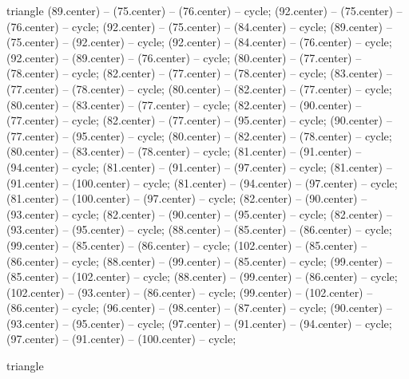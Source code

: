\begin{pgfonlayer}{triangle}
 (89.center) -- (75.center) -- (76.center) -- cycle; 
 (92.center) -- (75.center) -- (76.center) -- cycle; 
 (92.center) -- (75.center) -- (84.center) -- cycle; 
 (89.center) -- (75.center) -- (92.center) -- cycle; 
 (92.center) -- (84.center) -- (76.center) -- cycle; 
 (92.center) -- (89.center) -- (76.center) -- cycle; 
 (80.center) -- (77.center) -- (78.center) -- cycle; 
 (82.center) -- (77.center) -- (78.center) -- cycle; 
 (83.center) -- (77.center) -- (78.center) -- cycle; 
 (80.center) -- (82.center) -- (77.center) -- cycle; 
 (80.center) -- (83.center) -- (77.center) -- cycle; 
 (82.center) -- (90.center) -- (77.center) -- cycle; 
 (82.center) -- (77.center) -- (95.center) -- cycle; 
 (90.center) -- (77.center) -- (95.center) -- cycle; 
 (80.center) -- (82.center) -- (78.center) -- cycle; 
 (80.center) -- (83.center) -- (78.center) -- cycle; 
 (81.center) -- (91.center) -- (94.center) -- cycle; 
 (81.center) -- (91.center) -- (97.center) -- cycle; 
 (81.center) -- (91.center) -- (100.center) -- cycle; 
 (81.center) -- (94.center) -- (97.center) -- cycle; 
 (81.center) -- (100.center) -- (97.center) -- cycle; 
 (82.center) -- (90.center) -- (93.center) -- cycle; 
 (82.center) -- (90.center) -- (95.center) -- cycle; 
 (82.center) -- (93.center) -- (95.center) -- cycle; 
 (88.center) -- (85.center) -- (86.center) -- cycle; 
 (99.center) -- (85.center) -- (86.center) -- cycle; 
 (102.center) -- (85.center) -- (86.center) -- cycle; 
 (88.center) -- (99.center) -- (85.center) -- cycle; 
 (99.center) -- (85.center) -- (102.center) -- cycle; 
 (88.center) -- (99.center) -- (86.center) -- cycle; 
 (102.center) -- (93.center) -- (86.center) -- cycle; 
 (99.center) -- (102.center) -- (86.center) -- cycle; 
 (96.center) -- (98.center) -- (87.center) -- cycle; 
 (90.center) -- (93.center) -- (95.center) -- cycle; 
 (97.center) -- (91.center) -- (94.center) -- cycle; 
 (97.center) -- (91.center) -- (100.center) -- cycle; 
\end{pgfonlayer}{triangle} 
